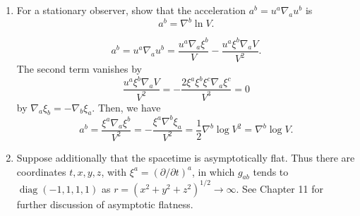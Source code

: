 \begin{enumerate}[label=\alph*)]
    \item For a stationary observer, show that the acceleration
    $a^b=u^a\nabla_a u^b$ is
    \begin{equation}
        a^b=\nabla^b\ln V.
    \end{equation}
    \begin{solution}
        \begin{equation}
            a^b = u^a \nabla_a u^b  = \frac{u^a \nabla_a \xi^b}{V} - \frac{u^a \xi^b \nabla_a V}{V^2}.
        \end{equation}
        The second term vanishes by
        \begin{equation}
            \frac{u^a \xi^b \nabla_a V}{V^2} = -\frac{2\xi^a\xi^b\xi^c\nabla_a\xi^c}{V^3} = 0
        \end{equation}
        by $\nabla_a \xi_b = - \nabla_b \xi_a$. Then, we have
        \begin{equation}
            a^b = \frac{\xi^a \nabla_a \xi^b}{V^2} = -\frac{\xi^a\nabla^b \xi_a}{V^2} = \frac{1}{2}\nabla^b \log V^2 = \nabla^b \log V.
        \end{equation}
    \end{solution}

    \item Suppose additionally that the spacetime is asymptotically flat. Thus
    there are coordinates $t,x,y,z$, with
    $\xi^a=(\partial/\partial t)^a$, in which $g_{ab}$ tends to
    $\operatorname{diag}(-1,1,1,1)$ as
    $r=(x^2+y^2+z^2)^{1/2}\to\infty$.
    See Chapter 11 for further discussion of asymptotic flatness.


\end{enumerate}

